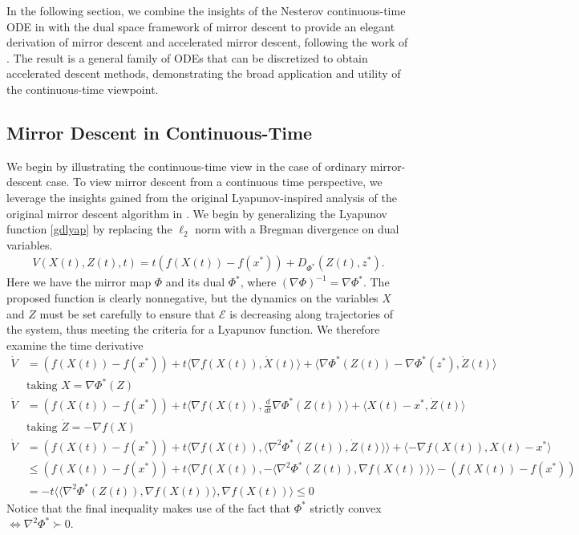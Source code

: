In the following section, we combine the insights of the Nesterov continuous-time ODE in \citet{su2014differential} with the dual space framework of mirror descent to provide an elegant derivation of mirror descent and accelerated mirror descent, following the work of \citet{krichene2015accelerated}. The result is a general family of ODEs that can be discretized to obtain accelerated descent methods, demonstrating the broad application and utility of the continuous-time viewpoint. %

\subsection{Mirror Descent in Continuous-Time}

We begin by illustrating the continuous-time view  in the case of ordinary mirror-descent case. To view mirror descent from a continuous time perspective, we leverage the insights gained from the original Lyapunov-inspired analysis of the original mirror descent algorithm in \citet{blair1985problem}. We begin by generalizing the Lyapunov function \eqref{gdlyap} by replacing the $\ell_2$ norm with a Bregman divergence on dual variables. 
\begin{align*}
V(X(t), Z(t), t) = t(f(X(t)) - f(x^*)) + D_{\Phi^*} (Z(t), z^*).
\end{align*}
Here we have the mirror map $\Phi$ and its dual $\Phi^*$, where $(\nabla \Phi)^{-1} = \nabla \Phi^*$.
The proposed function is clearly nonnegative, but the dynamics on the variables $X$ and $Z$ must be set carefully to ensure that $\mathcal{E}$ is decreasing along trajectories of the system, thus meeting the criteria for a Lyapunov function. We therefore examine the time derivative
\begin{align*}
\dot V &= (f(X(t)) - f(x^*)) + t\langle \nabla f(X(t)), \dot X(t) \rangle +  \langle \nabla \Phi^* (Z(t)) -  \nabla \Phi^* (z^*), \dot{Z}(t) \rangle\\
&\text{taking }X = \nabla \Phi ^* (Z)\\
\dot V&= (f(X(t)) - f(x^*)) + t\langle \nabla f(X(t)), \frac{d}{dt}\nabla\Phi^*(Z(t)) \rangle + \langle X(t) -  x^*, \dot{Z}(t) \rangle\\
&\text{taking }\dot Z = -\nabla f (X)\\
\dot V&= (f(X(t)) - f(x^*)) + t\langle\nabla f(X(t)), \langle \nabla^2\Phi^*(Z(t)), \dot Z(t) \rangle \rangle + \langle -\nabla f(X(t)), X(t) -  x^* \rangle \\
& \leq (f(X(t)) - f(x^*)) + t\langle\nabla f(X(t)), - \langle \nabla^2\Phi^*(Z(t)), \nabla f(X(t)) \rangle \rangle -(f(X(t)) - f(x^*))\\
& =  -t\langle  \langle \nabla^2\Phi^*(Z(t)), \nabla f(X(t)) \rangle,\nabla f(X(t))  \rangle \leq 0
\end{align*}
Notice that the final inequality makes use of the fact that $\Phi^*$ strictly convex $\iff \nabla^2\Phi^*\succ 0$. 


